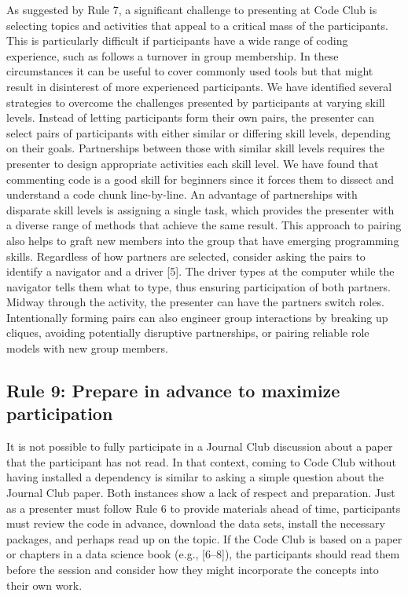 \documentclass[
  11pt,
]{article}
\begin{document}
As suggested by Rule 7, a significant challenge to presenting at Code
Club is selecting topics and activities that appeal to a critical mass
of the participants. This is particularly difficult if participants have
a wide range of coding experience, such as follows a turnover in group
membership. In these circumstances it can be useful to cover commonly
used tools but that might result in disinterest of more experienced
participants. We have identified several strategies to overcome the
challenges presented by participants at varying skill levels. Instead of
letting participants form their own pairs, the presenter can select
pairs of participants with either similar or differing skill levels,
depending on their goals. Partnerships between those with similar skill
levels requires the presenter to design appropriate activities each
skill level. We have found that commenting code is a good skill for
beginners since it forces them to dissect and understand a code chunk
line-by-line. An advantage of partnerships with disparate skill levels
is assigning a single task, which provides the presenter with a diverse
range of methods that achieve the same result. This approach to pairing
also helps to graft new members into the group that have emerging
programming skills. Regardless of how partners are selected, consider
asking the pairs to identify a navigator and a driver {[}5{]}. The
driver types at the computer while the navigator tells them what to
type, thus ensuring participation of both partners. Midway through the
activity, the presenter can have the partners switch roles.
Intentionally forming pairs can also engineer group interactions by
breaking up cliques, avoiding potentially disruptive partnerships, or
pairing reliable role models with new group members.

\hypertarget{rule-9-prepare-in-advance-to-maximize-participation}{%
\subsection{Rule 9: Prepare in advance to maximize
participation}\label{rule-9-prepare-in-advance-to-maximize-participation}}

It is not possible to fully participate in a Journal Club discussion
about a paper that the participant has not read. In that context, coming
to Code Club without having installed a dependency is similar to asking
a simple question about the Journal Club paper. Both instances show a
lack of respect and preparation. Just as a presenter must follow Rule 6
to provide materials ahead of time, participants must review the code in
advance, download the data sets, install the necessary packages, and
perhaps read up on the topic. If the Code Club is based on a paper or
chapters in a data science book (e.g., {[}6--8{]}), the participants
should read them before the session and consider how they might
incorporate the concepts into their own work.
\end{document}
